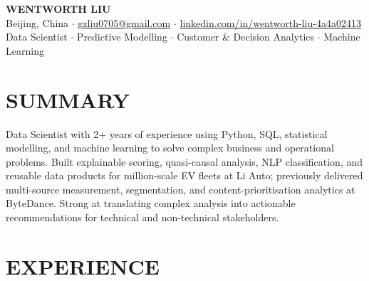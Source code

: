 \documentclass[a4paper,10pt]{article}
\begin{document}
\begin{center}
    {\Large\bfseries WENTWORTH LIU}\\[2pt]
    {\small Beijing, China \;$\cdot$\; \href{mailto:gzliu0705@gmail.com}{gzliu0705@gmail.com} \;$\cdot$\; \href{https://www.linkedin.com/in/wentworth-liu-4a4a02413/}{linkedin.com/in/wentworth-liu-4a4a02413}}\\[2pt]
    {\small Data Scientist \;$\cdot$\; Predictive Modelling \;$\cdot$\; Customer \& Decision Analytics \;$\cdot$\; Machine Learning}
\end{center}

\vspace{-3pt}

\section{SUMMARY}
Data Scientist with 2+ years of experience using Python, SQL, statistical modelling, and machine learning to solve complex business and operational problems. Built explainable scoring, quasi-causal analysis, NLP classification, and reusable data products for million-scale EV fleets at Li Auto; previously delivered multi-source measurement, segmentation, and content-prioritisation analytics at ByteDance. Strong at translating complex analysis into actionable recommendations for technical and non-technical stakeholders.

\section{EXPERIENCE}
\end{document}
